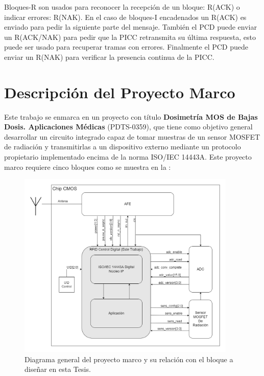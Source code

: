 \documentclass[a4paper, twoside, 11pt]{report}
\begin{document}
Bloques-R son usados para reconocer la recepción de un bloque: R(ACK) o indicar errores: R(NAK). En el caso de bloques-I encadenados un R(ACK) es enviado para pedir la siguiente parte del mensaje. También el PCD puede enviar un R(ACK/NAK) para pedir que la PICC retransmita su última respuesta, esto puede ser usado para recuperar tramas con errores. Finalmente el PCD puede enviar un R(NAK) para verificar la presencia continua de la PICC.


\FloatBarrier
\chapter{Descripción del Proyecto Marco}

Este trabajo se enmarca en un proyecto con título \textbf{Dosimetría MOS de Bajas Dosis. Aplicaciones Médicas} (PDTS-0359), que tiene como objetivo general desarrollar un circuito integrado capaz de tomar muestras de un sensor MOSFET de radiación y transmitirlas a un dispositivo externo mediante un protocolo propietario implementado encima de la norma ISO/IEC 14443A. Este proyecto marco requiere cinco bloques como se muestra en la :

\begin{figure}[htb]
  \centering
  \includegraphics[width=0.93\textwidth]{./img/entire_project_v2}
  \caption{Diagrama general del proyecto marco y su relación con el bloque a diseñar en esta Tesis.}
  \label{fig:entire_project}
\end{figure}
\end{document}
